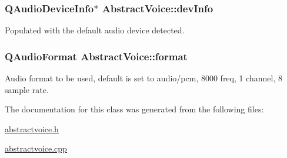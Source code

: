 \hypertarget{class_abstract_voice_ac27882c5cb69564cbc4d5cca7847a359}{
\subsubsection[{dev\-Info}]{\setlength{\rightskip}{0pt plus 5cm}\-Q\-Audio\-Device\-Info$\ast$ {\bf \-Abstract\-Voice\-::dev\-Info}}}
\label{class_abstract_voice_ac27882c5cb69564cbc4d5cca7847a359}


\-Populated with the default audio device detected. 

\hypertarget{class_abstract_voice_aa8718f0af1669ef7a84347c2d9a54cf9}{
\subsubsection[{format}]{\setlength{\rightskip}{0pt plus 5cm}\-Q\-Audio\-Format {\bf \-Abstract\-Voice\-::format}}}
\label{class_abstract_voice_aa8718f0af1669ef7a84347c2d9a54cf9}


\-Audio format to be used, default is set to audio/pcm, 8000 freq, 1 channel, 8 sample rate. 



\-The documentation for this class was generated from the following files\-:\begin{DoxyCompactItemize}
\item 
\hyperlink{abstractvoice_8h}{abstractvoice.\-h}\item 
\hyperlink{abstractvoice_8cpp}{abstractvoice.\-cpp}\end{DoxyCompactItemize}

